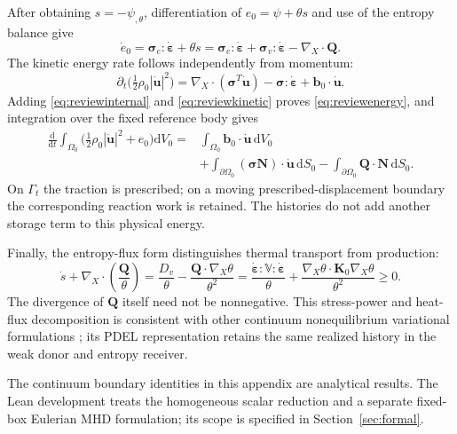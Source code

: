 \documentclass[11pt,a4paper]{article}
\theoremstyle{remark}\newtheorem{remark}{Remark}
\numberwithin{equation}{section}
\newcommand{\dd}{\mathrm{d}}
\newcommand{\grad}{\nabla}
\begin{document}
After obtaining $s=-\psi_{,\theta}$, differentiation of $e_0=\psi+\theta s$ and use of the entropy balance give
\begin{equation}
\dot e_0
=\boldsymbol\sigma_e:\dot{\boldsymbol\varepsilon}+\theta\dot s
=\boldsymbol\sigma_e:\dot{\boldsymbol\varepsilon}
+\boldsymbol\sigma_v:\dot{\boldsymbol\varepsilon}
-\grad_X\!\cdot\boldsymbol Q.
\label{eq:reviewinternal}
\end{equation}
The kinetic energy rate follows independently from momentum:
\begin{equation}
\partial_t\big(\tfrac12\rho_0|\dot{\boldsymbol u}|^2\big)
=\grad_X\!\cdot(\boldsymbol\sigma^T\dot{\boldsymbol u})
-\boldsymbol\sigma:\dot{\boldsymbol\varepsilon}
+\boldsymbol b_0\cdot\dot{\boldsymbol u}.
\label{eq:reviewkinetic}
\end{equation}
Adding \eqref{eq:reviewinternal} and \eqref{eq:reviewkinetic} proves \eqref{eq:reviewenergy}, and integration over the fixed reference body gives
\begin{equation}
\begin{aligned}
\frac{\dd}{\dd t}\int_{\Omega_0}
\big(\tfrac12\rho_0|\dot{\boldsymbol u}|^2+e_0\big)\dd V_0
={}&\int_{\Omega_0}\boldsymbol b_0\cdot\dot{\boldsymbol u}\,\dd V_0\\
&+\int_{\partial\Omega_0}
(\boldsymbol\sigma\boldsymbol N)\cdot\dot{\boldsymbol u}\,\dd S_0
-\int_{\partial\Omega_0}\boldsymbol Q\cdot\boldsymbol N\,\dd S_0.
\end{aligned}
\label{eq:reviewboundarybudget}
\end{equation}
On $\Gamma_t$ the traction is prescribed; on a moving prescribed-displacement boundary the corresponding reaction work is retained. The histories do not add another storage term to this physical energy.

Finally, the entropy-flux form distinguishes thermal transport from production:
\begin{equation}
\dot s+\grad_X\!\cdot\left(\frac{\boldsymbol Q}{\theta}\right)
=\frac{D_v}{\theta}-\frac{\boldsymbol Q\cdot\grad_X\theta}{\theta^2}
=\frac{\dot{\boldsymbol\varepsilon}:\mathbb V:\dot{\boldsymbol\varepsilon}}{\theta}
+\frac{\grad_X\theta\cdot\boldsymbol K_0\grad_X\theta}{\theta^2}\ge0.
\label{eq:reviewentropyflux}
\end{equation}
The divergence of $\boldsymbol Q$ itself need not be nonnegative. This stress-power and heat-flux decomposition is consistent with other continuum nonequilibrium variational formulations \citep{GayBalmaz2017b}; its PDEL representation retains the same realized history in the weak donor and entropy receiver.

The continuum boundary identities in this appendix are analytical results. The Lean development treats the homogeneous scalar reduction and a separate fixed-box Eulerian MHD formulation; its scope is specified in Section~\ref{sec:formal}.


\FloatBarrier
\begingroup\small
\setlength{\bibsep}{2.5pt}


\endgroup
\end{document}

